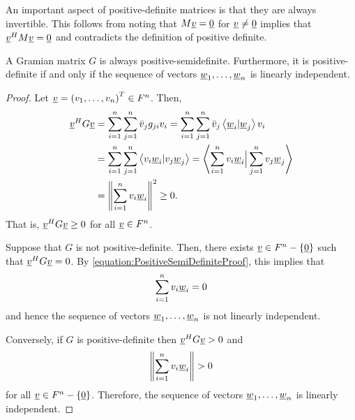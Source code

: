 An important aspect of positive-definite matrices is that they are always invertible.
This follows from noting that $M\underline{v} = \underline{0}$ for $\underline{v}\neq\underline{0}$ implies that $\underline{v}^H M \underline{v} = \underline{0}$ and contradicts the definition of positive definite.

\begin{theorem}
A Gramian matrix $G$ is always positive-semidefinite.
Furthermore, it is positive-definite if and only if the sequence of vectors $\underline{w}_1, \ldots, \underline{w}_n$ is linearly independent.
\end{theorem}
\begin{proof}
Let $\underline{v} = \left( v_1, \ldots, v_n \right)^T \in F^n$.
Then,
\begin{equation} \label{equation:PositiveSemiDefiniteProof}
\begin{split}
\underline{v}^H G \underline{v} &=
\sum_{i=1}^n \sum_{j=1}^n \bar{v}_j g_{ji} v_i
= \sum_{i=1}^n \sum_{j=1}^n \bar{v}_j \left\langle \underline{w}_i | \underline{w}_j \right\rangle v_i \\
&= \sum_{i=1}^n \sum_{j=1}^n \left\langle v_i \underline{w}_i | v_j \underline{w}_j \right\rangle
= \left\langle \sum_{i=1}^n v_i \underline{w}_i \Big| \sum_{j=1}^n v_j \underline{w}_j \right\rangle \\
&= \left\| \sum_{i=1}^n v_i \underline{w}_i \right\|^2
\geq 0.
\end{split}
\end{equation}
That is, $\underline{v}^H G \underline{v} \geq 0$ for all $\underline{v} \in F^n$.

Suppose that $G$ is not positive-definite.
Then, there exists $\underline{v} \in F^n - \left\{ \underline{0} \right\}$ such that $\underline{v}^H G \underline{v} = 0$.
By \eqref{equation:PositiveSemiDefiniteProof}, this implies that
\begin{equation*}
\sum_{i=1}^n v_i \underline{w}_i = 0
\end{equation*}
and hence the sequence of vectors $\underline{w}_1, \ldots, \underline{w}_n$ is not linearly independent.

Conversely, if $G$ is positive-definite then $\underline{v}^H G \underline{v} > 0$ and
\begin{equation*}
\left\| \sum_{i=1}^n v_i \underline{w}_i \right\| > 0
\end{equation*}
for all $\underline{v} \in F^n - \left\{ \underline{0} \right\}$.
Therefore, the sequence of vectors $\underline{w}_1, \ldots, \underline{w}_n$ is linearly independent.
\end{proof}


